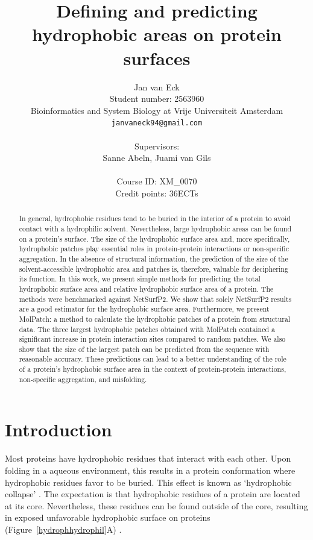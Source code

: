 \documentclass[11pt,a4paper]{article}
\title{Defining and predicting hydrophobic areas on protein surfaces}
\author{Jan van Eck\\
    Student number: 2563960\\
  Bioinformatics and System Biology at Vrije Universiteit Amsterdam \\
  \texttt{janvaneck94@gmail.com} \\\
  \\
  Supervisors:\\
  Sanne Abeln, Juami van Gils\\
  \\
  Course ID: XM\_0070\\
  Credit points: 36ECTs
  
}
\begin{document}
\maketitle



\clearpage
\begin{abstract}
  In general, hydrophobic residues tend to be buried in the interior of a protein to avoid contact with a hydrophilic solvent. Nevertheless, large hydrophobic areas can be found on a protein’s surface. The size of the hydrophobic surface area and, more specifically, hydrophobic patches play essential roles in protein-protein interactions or non-specific aggregation. In the absence of structural information, the prediction of the size of the solvent-accessible hydrophobic area and patches is, therefore, valuable for deciphering its function. In this work, we present simple methods for predicting the total hydrophobic surface area and relative hydrophobic surface area of a protein. The methods were benchmarked against NetSurfP2. We show that solely NetSurfP2 results are a good estimator for the hydrophobic surface area. Furthermore, we present MolPatch: a method to calculate the hydrophobic patches of a protein from structural data. The three largest hydrophobic patches obtained with MolPatch contained a significant increase in protein interaction sites compared to random patches. We also show that the size of the largest patch can be predicted from the sequence with reasonable accuracy. These predictions can lead to a better understanding of the role of a protein's hydrophobic surface area in the context of protein-protein interactions, non-specific aggregation, and misfolding.
\end{abstract}
\section{Introduction}
Most proteins have hydrophobic residues that interact with each other. Upon folding in a aqueous environment, this results in a protein conformation where hydrophobic residues favor to be buried. This effect is known as ‘hydrophobic collapse’  \cite{dill1985theory}. The expectation is that hydrophobic residues of a protein are located at its core. Nevertheless, these residues can be found outside of the core, resulting in exposed unfavorable hydrophobic surface on proteins (Figure~\ref{hydrophhydrophil}A) \cite{van1995hydrophobicity,  kato1980hydrophobicity}.
\end{document}
